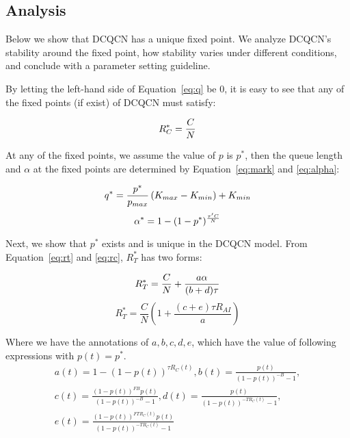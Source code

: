 \subsection{Analysis}

Below we show that DCQCN has a unique fixed point. We analyze DCQCN's stability around the 
fixed point, how stability varies under different conditions, and conclude with a 
parameter setting guideline.


 By letting the left-hand side of Equation~\ref{eq:q}
be 0, it is easy to see that any of the fixed points (if exist) of DCQCN must satisfy:

\begin{equation}
\small
{R_C^*} = \frac{C}{N}
\end{equation}

At any of the fixed points, we assume the value of $p$ is $p^*$, then the queue length and
$\alpha$ at the fixed points are determined by Equation~\ref{eq:mark} and \ref{eq:alpha}:

\begin{equation}
\small
{q^*} = \frac{{{p^*}}}{{{p_{max}}}}\left( {{K_{max}} - {K_{min}}} \right) + {K_{min}}
\end{equation}
\begin{equation}
\small
\alpha^*  = 1 - {(1 - p^*)^{\frac{{\tau 'C}}{N}}}
\end{equation}

Next, we show that $p^*$ exists and is unique in the DCQCN model. 
From Equation~\ref{eq:rt} and \ref{eq:rc}, $R_T^*$ has two forms:

\begin{equation}
\small
{R_T^*} = \frac{C}{N} + \frac{{a\alpha }}{{(b + d)\tau }}
\end{equation}
\begin{equation}
{R_T^*} = \frac{C}{N}\left( {1 + \frac{{(c + e)\tau {R_{AI}}}}{a}} \right)
\end{equation}

Where we have the annotations of $a, b, c, d, e$, which have the value of following expressions
with $p(t) = p^*$.
\begin{equation}
\begin{array}{l}
a(t) = 1 - {(1 - p(t))^{\tau {R_C}(t)}},b(t) = \frac{{p(t)}}{{{{(1 - p(t))}^{ - B}} - 1}},\\
c(t) = \frac{{{{(1 - p(t))}^{FB}}p(t)}}{{{{(1 - p(t))}^{ - B}} - 1}},d(t) = \frac{{p(t)}}{{{{(1 - p(t))}^{ - T{R_C}(t)}} - 1}},\\
e(t) = \frac{{{{(1 - p(t))}^{FT{R_C}(t)}}p(t)}}{{{{(1 - p(t))}^{ - T{R_C}(t)}} - 1}}
\end{array}
\end{equation}

